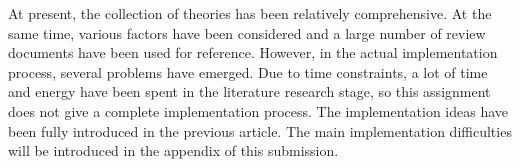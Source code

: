 \documentclass[10pt, a4paper, twocolumn]{article} %
\begin{document}
At present, the collection of theories has been relatively comprehensive. At the same time, various factors have been considered and a large number of review documents have been used for reference. However, in the actual implementation process, several problems have emerged. Due to time constraints, a lot of time and energy have been spent in the literature research stage, so this assignment does not give a complete implementation process. The implementation ideas have been fully introduced in the previous article. The main implementation difficulties will be introduced in the appendix of this submission.




\printbibliography%

\end{document}
